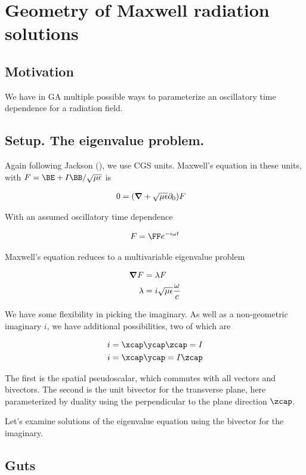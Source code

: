 

\chapter{Geometry of Maxwell radiation solutions}
\label{chap:radiationGeometry}
{}
\date{Aug 14, 2009}

\beginArtWithToc

\section{Motivation}

We have in GA multiple possible ways to parameterize an oscillatory time dependence for a radiation field.  
\section{Setup.  The eigenvalue problem.}

Again following Jackson (\cite{jackson1975cew}), we use CGS units.  Maxwell's equation in these units, with $F = \BE + I\BB/\sqrt{\mu\epsilon}$ is

\begin{align}\label{eqn:foo1}
0 &= (\boldsymbol{\nabla} + \sqrt{\mu\epsilon} \partial_0) F 
\end{align}

With an assumed oscillatory time dependence 

\begin{align}\label{eqn:foo2}
F = \FF e^{-i\omega t}
\end{align}

Maxwell's equation reduces to a multivariable eigenvalue problem

\begin{align}\label{eqn:foo3}
\boldsymbol{\nabla} F &= \lambda F \\
\lambda &= i\sqrt{\mu\epsilon} \frac{\omega}{c} 
\end{align}

We have some flexibility in picking the imaginary.  As well as a non-geometric imaginary $i$, we have additional possibilities, two of which are

\begin{align*}
i &= \xcap\ycap\zcap = I \\
i &= \xcap \ycap = I \zcap
\end{align*}

The first is the spatial pseudoscalar, which commutes with all vectors and bivectors.  The second is the unit bivector for the transverse plane, here parameterized by duality using the perpendicular to the plane direction $\zcap$.

Let's examine solutions of the eigenvalue equation using the bivector for the imaginary.


\section{Guts}

\EndNoBibArticle

